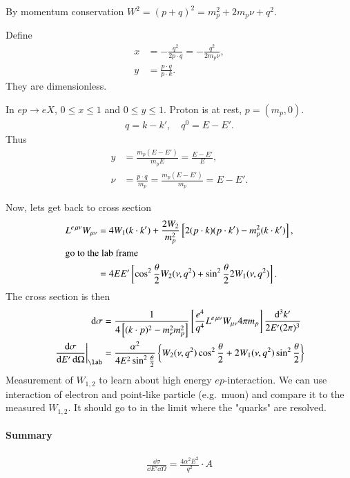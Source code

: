 By momentum conservation $W^2 = (p + q)^2 = m_p^2 + 2 m_p \nu + q^2 $.

Define 
\begin{align}
   x &= - \frac{q^2}{2 p \cdot q} = -\frac{q^2}{2 m_p \nu}, \\
   y &= \frac{p \cdot q }{p \cdot k}.
\end{align}
They are dimensionless. 

In $e p \rightarrow e X$, $0 \leq x \leq 1$ and  $0 \leq y \leq 1$.  Proton is at rest, $p = (m_p, 0)$.
\begin{align*}
   q = k - k',\quad q^0 = E - E'.
\end{align*}
Thus 
\begin{align*}
   y &= \frac{m_p (E-E')}{m_p E} = \frac{E-E'}{E},  \\
   \nu &= \frac{p \cdot q}{m_p} = \frac{m_p (E- E')}{m_p} = E- E'.
\end{align*}

Now, lets get back to cross section
\begin{align*}
   L^{e \, \mu\nu} W_{\mu\nu} &= 4 W_1 (k \cdot k') + \frac{2 W_2}{m_p^2} \left[ 2 (p\cdot k )(p \cdot k') - m_p^2 (k\cdot k') \right], \\
   \shortintertext{go to the lab frame}
                              &= 4 E E' \left[ \cos^2 \frac{\theta}{2} W_2 (\nu,  q^2) + \sin^2 \frac{\theta}{2} 2 W_1 (\nu, q^2) \right].
\end{align*}
The cross section is then
\begin{align*}
   \dd{\sigma} &= \frac{1}{ 4 \left[ (k \cdot p)^2 - m_e^2 m _p^2 \right]} \left[ \frac{e^4}{q^4} L^{e\, \mu\nu} W_{\mu\nu} 4 \pi m_p \right] \frac{\dd[3]{k'}}{ 2E' (2\pi)^3} \\
   \eval{\frac{\dd{\sigma}}{\dd{E'}\dd{\Omega}}}_{\text{\lab}} &= \frac{\alpha^2}{4 E^2 \sin^2 \frac{\theta}{2}} \left\{ W_2 (\nu, q^2) \cos^2 \frac{\theta}{2} + 2 W_1 (\nu, q^2) \sin^2 \frac{\theta}{2} \right\}
\end{align*}
Measurement of $W_{1,2}$ to learn about high energy $ep$-interaction. We can use interaction of electron and point-like particle (e.g.~muon) and compare it to the measured $W_{1,2}$. It should go to in the limit where the "quarks" are resolved.

\paragraph{Summary}
\begin{align}
   \frac{\dd{\sigma}}{\dd{E'}\dd{\Omega}} = \frac{4 \alpha^2 E^2 }{q^2 } \cdot A
\end{align}


